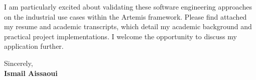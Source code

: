 \documentclass[11pt,a4paper]{article}
\begin{document}
\vspace{0.5em}
\noindent
I am particularly excited about validating these software engineering approaches on the industrial use cases within the Artemis framework. Please find attached my resume and academic transcripts, which detail my academic background and practical project implementations. I welcome the opportunity to discuss my application further.

\vspace{1.5em}
\noindent
Sincerely, \\[0.5em]
\textbf{Ismail Aissaoui}
\end{document}
